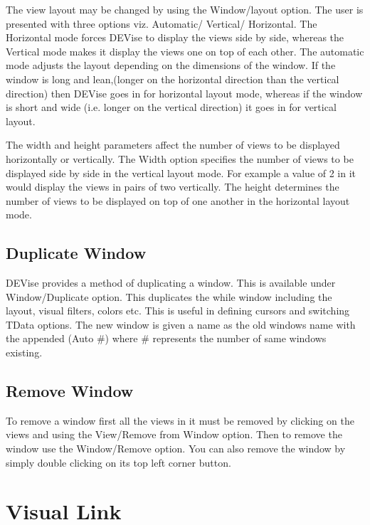 The view layout may be changed by using the Window/layout option. The
user is presented with three options viz. Automatic/ Vertical/
Horizontal. The Horizontal mode forces DEVise to display the views
side by side, whereas the Vertical mode makes it display the views one
on top of each other. The automatic mode adjusts the layout depending
on the dimensions of the window. If the window is long and
lean,(longer on the horizontal direction than the vertical direction)
then DEVise goes in for horizontal layout mode, whereas if the window
is short and wide (i.e. longer on the vertical direction) it goes in
for vertical layout.

The width and height parameters affect the number of views to be
displayed horizontally or vertically. The Width option specifies the
number of views to be displayed side by side in the vertical layout
mode. For example a value of 2 in it would display the views in pairs
of two vertically. The height determines the number of views to be
displayed on top of one another in the horizontal layout mode.

\subsection{Duplicate Window}

DEVise provides a method of duplicating a window. This is available
under Window/Duplicate option. This duplicates the while window
including the layout, visual filters, colors etc. This is useful in
defining cursors and switching TData options. The new window is given
a name as the old windows name with the appended (Auto \#) where \#
represents the number of same windows existing.


\subsection{Remove Window}

To remove a window first all the views in it must be removed by
clicking on the views and using the View/Remove from Window
option. Then to remove the window use the Window/Remove option. You
can also remove the window by simply double clicking on its top left
corner button.


\section{Visual Link}

